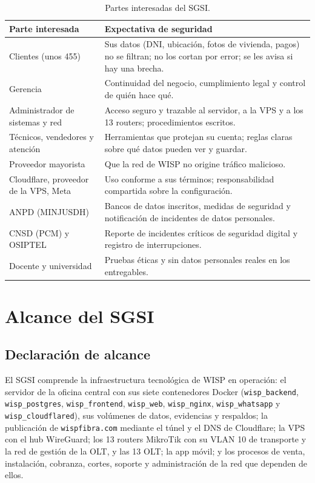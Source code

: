 \begin{table}[H]
\centering
\caption{Partes interesadas del SGSI.}
\label{tab:ce03-sgsi-interesados}
\small
\begin{tabularx}{\textwidth}{L{3.2cm}X}
\toprule
\textbf{Parte interesada} & \textbf{Expectativa de seguridad} \\
\midrule
Clientes (unos 455) & Sus datos (DNI, ubicación, fotos de vivienda, pagos) no se filtran; no los cortan por error; se les avisa si hay una brecha. \\
Gerencia & Continuidad del negocio, cumplimiento legal y control de quién hace qué. \\
Administrador de sistemas y red & Acceso seguro y trazable al servidor, a la VPS y a los 13 routers; procedimientos escritos. \\
Técnicos, vendedores y atención & Herramientas que protejan su cuenta; reglas claras sobre qué datos pueden ver y guardar. \\
Proveedor mayorista & Que la red de WISP no origine tráfico malicioso. \\
Cloudflare, proveedor de la VPS, Meta & Uso conforme a sus términos; responsabilidad compartida sobre la configuración. \\
ANPD (MINJUSDH) & Bancos de datos inscritos, medidas de seguridad y notificación de incidentes de datos personales. \\
CNSD (PCM) y OSIPTEL & Reporte de incidentes críticos de seguridad digital y registro de interrupciones. \\
Docente y universidad & Pruebas éticas y sin datos personales reales en los entregables. \\
\bottomrule
\end{tabularx}
\end{table}

\section{Alcance del SGSI}

\subsection{Declaración de alcance}
El SGSI comprende la infraestructura tecnológica de WISP en operación: el servidor de la
oficina central con sus siete contenedores Docker (\texttt{wisp\_backend},
\texttt{wisp\_postgres}, \texttt{wisp\_frontend}, \texttt{wisp\_web},
\texttt{wisp\_nginx}, \texttt{wisp\_whatsapp} y \texttt{wisp\_cloudflared}), sus volúmenes de
datos, evidencias y respaldos; la publicación de \texttt{wispfibra.com} mediante el túnel y el DNS de Cloudflare; la VPS con el hub WireGuard; los 13 routers MikroTik con su VLAN 10 de transporte y la red de gestión de la OLT, y
las 13 OLT; la app móvil; y los procesos de venta, instalación, cobranza, cortes, soporte y
administración de la red que dependen de ellos.


